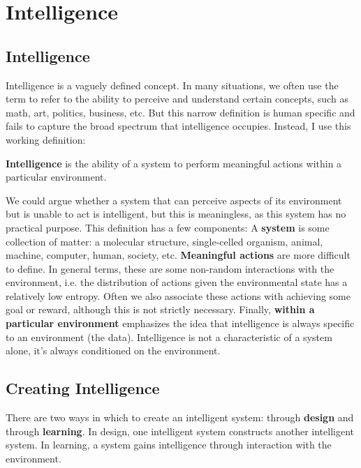 \chapter{Intelligence}

\section{Intelligence}

Intelligence is a vaguely defined concept. In many situations, we often use the term to refer to the ability to perceive and understand certain concepts, such as math, art, politics, business, etc. But this narrow definition is human specific and fails to capture the broad spectrum that intelligence occupies. Instead, I use this working definition:

\begin{center}
	\textbf{Intelligence} is the ability of a system to perform meaningful actions within a particular environment.
\end{center}

We could argue whether a system that can perceive aspects of its environment but is unable to act is intelligent, but this is meaningless, as this system has no practical purpose. This definition has a few components: A \textbf{system} is some collection of matter: a molecular structure, single-celled organism, animal, machine, computer, human, society, etc. \textbf{Meaningful actions} are more difficult to define. In general terms, these are some non-random interactions with the environment, i.e. the distribution of actions given the environmental state has a relatively low entropy. Often we also associate these actions with achieving some goal or reward, although this is not strictly necessary. Finally, \textbf{within a particular environment} emphasizes the idea that intelligence is always specific to an environment (the data). Intelligence is not a characteristic of a system alone, it's always conditioned on the environment.

\section{Creating Intelligence}

There are two ways in which to create an intelligent system: through \textbf{design} and through \textbf{learning}. In design, one intelligent system constructs another intelligent system. In learning, a system gains intelligence through interaction with the environment.